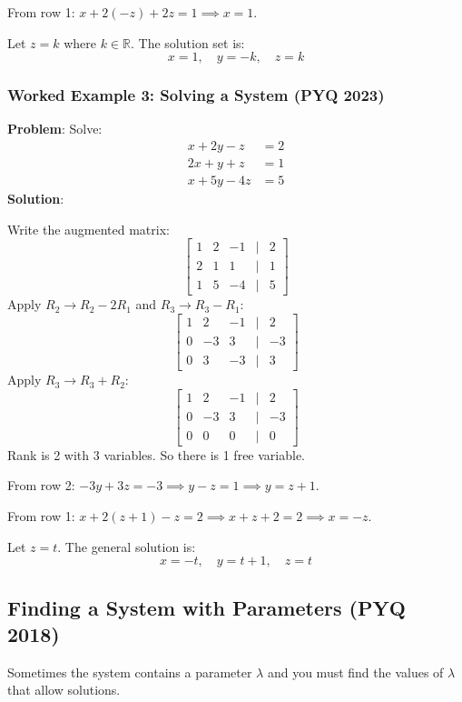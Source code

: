 \documentclass[
]{article}
\begin{document}
From row 1: \(x + 2(-z) + 2z = 1 \implies x = 1\).

Let \(z = k\) where \(k \in \mathbb{R}\). The solution set is:
\[
x = 1, \quad y = -k, \quad z = k
\]

\subsubsection{Worked Example 3: Solving a System (PYQ
2023)}\label{worked-example-3-solving-a-system-pyq-2023}

\textbf{Problem}: Solve:
\[
\begin{aligned}
x + 2y - z &= 2 \\
2x + y + z &= 1 \\
x + 5y - 4z &= 5
\end{aligned}
\]
\textbf{Solution}:

Write the augmented matrix:
\[
\begin{bmatrix}
1 & 2 & -1 & | & 2 \\
2 & 1 & 1 & | & 1 \\
1 & 5 & -4 & | & 5
\end{bmatrix}
\]
Apply \(R_2 \to R_2 - 2R_1\) and \(R_3 \to R_3 - R_1\):
\[
\begin{bmatrix}
1 & 2 & -1 & | & 2 \\
0 & -3 & 3 & | & -3 \\
0 & 3 & -3 & | & 3
\end{bmatrix}
\]
Apply \(R_3 \to R_3 + R_2\):
\[
\begin{bmatrix}
1 & 2 & -1 & | & 2 \\
0 & -3 & 3 & | & -3 \\
0 & 0 & 0 & | & 0
\end{bmatrix}
\]
Rank is 2 with 3 variables. So there is 1 free variable.

From row 2: \(-3y + 3z = -3 \implies y - z = 1 \implies y = z + 1\).

From row 1:
\(x + 2(z + 1) - z = 2 \implies x + z + 2 = 2 \implies x = -z\).

Let \(z = t\). The general solution is:
\[
x = -t, \quad y = t + 1, \quad z = t
\]

\subsection{Finding a System with Parameters (PYQ
2018)}\label{finding-a-system-with-parameters-pyq-2018}

Sometimes the system contains a parameter \(\lambda\) and you must find
the values of \(\lambda\) that allow solutions.
\end{document}
